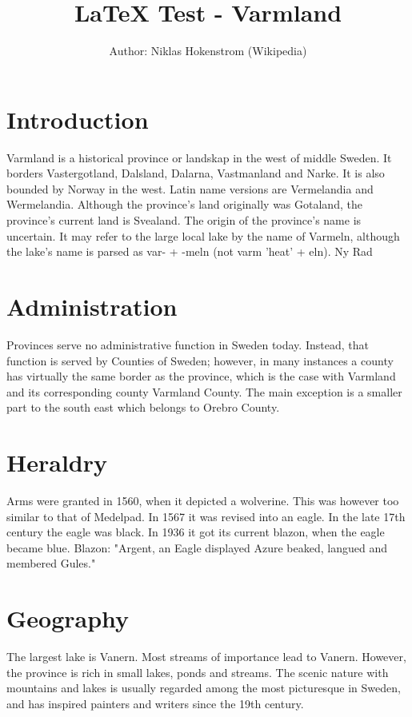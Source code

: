 \documentclass[a4paper, 11pt]{article}
\begin{document}
\title{\LaTeX{} Test - Varmland}
\author{Author: Niklas Hokenstrom (Wikipedia)}

\maketitle

\section{Introduction}
Varmland is a historical province or landskap in the west of middle Sweden. It borders Vastergotland, Dalsland, Dalarna, Vastmanland and Narke. It is also bounded by Norway in the west. Latin name versions are Vermelandia and Wermelandia. Although the province's land originally was Gotaland, the province's current land is Svealand. The origin of the province's name is uncertain. It may refer to the large local lake by the name of Varmeln, although the lake's name is parsed as var- + -meln (not varm 'heat' + eln). Ny Rad

\section{Administration}
Provinces serve no administrative function in Sweden today. Instead, that function is served by Counties of Sweden; however, in many instances a county has virtually the same border as the province, which is the case with Varmland and its corresponding county Varmland County. The main exception is a smaller part to the south east which belongs to Orebro County.

\section{Heraldry}
Arms were granted in 1560, when it depicted a wolverine. This was however too similar to that of Medelpad. In 1567 it was revised into an eagle. In the late 17th century the eagle was black. In 1936 it got its current blazon, when the eagle became blue. Blazon: "Argent, an Eagle displayed Azure beaked, langued and membered Gules."

\section{Geography}
The largest lake is Vanern. Most streams of importance lead to Vanern. However, the province is rich in small lakes, ponds and streams. The scenic nature with mountains and lakes is usually regarded among the most picturesque in Sweden, and has inspired painters and writers since the 19th century.
\end{document}
